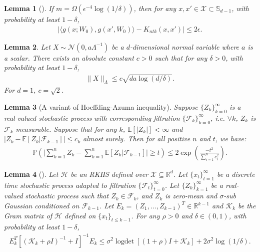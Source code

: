 \documentclass{article} \usepackage{iclr2023/iclr2023_conference,times}
\DeclareMathOperator*{\logdet}{logdet}
\newtheorem{lemma}{Lemma}[section]
\begin{document}
\begin{lemma}[{\cite[Theorem~3]{arora2019exact}}]
\label{lemma: ntk gram matrix versus grad gram matrix}
If $m = \Omega(\epsilon^{-4} \log(1/\delta))$, then for any $x, x' \in \mathcal{X} \subset \mathbb{S}_{d-1}$, with probability at least $1 - \delta$, 
\begin{align*}
    |\langle g(x; W_0), g(x', W_0) \rangle  - K_{ntk}(x,x') | \leq 2 \epsilon. 
\end{align*}
\end{lemma}


\begin{lemma}
Let $X \sim \mathcal{N}(0, a \Lambda^{-1})$ be a $d$-dimensional normal variable where $a$ is a scalar. There exists an absolute constant $c > 0$ such that for any $\delta > 0$, with probability at least $1 - \delta$, 
\begin{align*}
    \| X \|_{\Lambda} \leq c \sqrt{d a \log (d/\delta)}. 
\end{align*}
For $d = 1$, $c = \sqrt{2}$. 

\label{lemma: Concentration of multivariate Gaussian}
\end{lemma}

\begin{lemma}[A variant of Hoeffding-Azuma inequality]
Suppose $\{Z_k\}_{k = 0}^{\infty}$ is a real-valued stochastic process with corresponding filtration $\{\mathcal{F}_{k}\}_{k=0}^{\infty}$, i.e. $\forall k $, $Z_k$ is $\mathcal{F}_k$-measurable. Suppose that for any $k$, $\mathbb{E}[|Z_k|] < \infty$ and $|Z_k - \mathbb{E} \left[ Z_k | \mathcal{F}_{k-1} \right]| \leq c_k$ almost surely. Then for all positive $n$ and $t$, we have: 
\begin{align*}
    \mathbb{P}\left( \bigg|\sum_{k=1}^n Z_k  -  \sum_{k=1}^n  \mathbb{E} \left[ Z_k | \mathcal{F}_{k-1} \right] \bigg| \geq t \right) \leq 2 \exp \left( \frac{-t^2}{\sum_{i=1}^n c_i^2} \right).
\end{align*}
\label{lemma:azuma}
\end{lemma}

\begin{lemma}[{\citep[Theorem~1]{chowdhury2017kernelized}}]
Let $\mathcal{H}$ be an RKHS defined over $\mathcal{X} \subseteq \mathbb{R}^d$. Let $\{x_t\}_{t=1}^{\infty}$ be a discrete time stochastic process adapted to filtration $\{\mathcal{F}_t\}_{t=0}^{\infty}$. Let $\{Z_k\}_{k=1}^{\infty}$ be a real-valued stochastic process such that $Z_k \in \mathcal{F}_k$, and $Z_k$ is zero-mean and $\sigma$-sub Gaussian conditioned on $\mathcal{F}_{k-1}$. Let $E_k = (Z_1, \ldots, Z_{k-1})^T \in \mathbb{R}^{k-1}$ and $\mathcal{K}_k$ be the Gram matrix of $\mathcal{H}$ defined on $\{x_t\}_{t \leq k - 1}$. For any $\rho > 0$ and $\delta \in (0,1)$, with probability at least $1 - \delta$, 
\begin{align*}
    E_k^T \left[ (\mathcal{K}_k + \rho I)^{-1} + I \right]^{-1} E_k \leq \sigma^2 \logdet \left[ (1 + \rho) I + \mathcal{K}_k\right] + 2 \sigma^2 \log (1 / \delta). 
\end{align*}
\label{lemma: self-normalized concentration process in RKHS}
\end{lemma}
\end{document}
